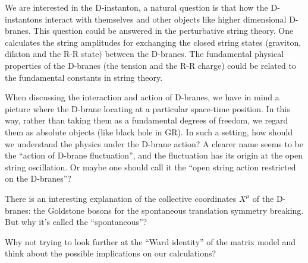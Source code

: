 We are interested in the D-instanton,
a natural question is that how the D-instantons interact with themselves
and other objects like higher dimensional D-branes.
This question could be answered in the perturbative string theory.
One calculates the string amplitudes for exchanging the closed string states (graviton, dilaton and the R-R state) between the D-branes.
The fundamental physical properties of the D-branes 
(the tension and the R-R charge)
could be related to the fundamental constants in string theory.
\begin{question}
	When discussing the interaction and action of D-branes, we have in mind a picture where the D-brane locating at a particular space-time position.
	In this way, rather than taking them as a fundamental degrees of freedom, we regard them as absolute objects (like black hole in GR).
	In such a setting, how should we understand the physics under the D-brane action?
	A clearer name seems to be the ``action of D-brane fluctuation'',
	and the fluctuation has its origin at the open string oscillation.
	Or maybe one should call it the ``open string action restricted on the D-branes''?
\end{question}

There is an interesting explanation of the collective coordinates $X^\mu$ of the D-branes: 
the Goldstone bosons for the spontaneous translation symmetry breaking.
But why it's called the ``spontaneous''?
\begin{idea}
	Why not trying to look further at the ``Ward identity'' of the matrix model and think about the possible implications on our calculations?
\end{idea}
